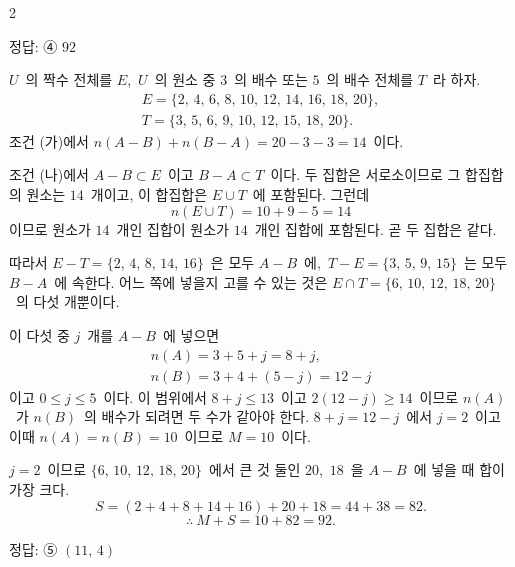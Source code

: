 \documentclass[10pt,fleqn]{article}
\begin{document}
\begin{multicols*}{2}
\begin{dmanswerbox}
정답: ④ $92$
\end{dmanswerbox}

$U$\ 의 짝수 전체를 $E$,\ $U$\ 의 원소 중 $3$\ 의 배수 또는 $5$\ 의 배수 전체를 $T$\ 라 하자.
\begin{gather*}
E=\{2,\,4,\,6,\,8,\,10,\,12,\,14,\,16,\,18,\,20\},\\
T=\{3,\,5,\,6,\,9,\,10,\,12,\,15,\,18,\,20\}.
\end{gather*}
조건 (가)에서 $n(A-B)+n(B-A)=20-3-3=14$\ 이다.

조건 (나)에서 $A-B\subset E$\ 이고 $B-A\subset T$\ 이다. 두 집합은 서로소이므로 그 합집합의 원소는 $14$\ 개이고, 이 합집합은 $E\cup T$\ 에 포함된다. 그런데
$$n(E\cup T)=10+9-5=14$$
이므로 원소가 $14$\ 개인 집합이 원소가 $14$\ 개인 집합에 포함된다. 곧 두 집합은 같다.

따라서 $E-T=\{2,\,4,\,8,\,14,\,16\}$\ 은 모두 $A-B$\ 에,\ $T-E=\{3,\,5,\,9,\,15\}$\ 는 모두 $B-A$\ 에 속한다. 어느 쪽에 넣을지 고를 수 있는 것은 $E\cap T=\{6,\,10,\,12,\,18,\,20\}$\ 의 다섯 개뿐이다.

이 다섯 중 $j$\ 개를 $A-B$\ 에 넣으면
\begin{gather*}
n(A)=3+5+j=8+j,\\
n(B)=3+4+(5-j)=12-j
\end{gather*}
이고 $0\le j\le 5$\ 이다. 이 범위에서 $8+j\le 13$\ 이고 $2(12-j)\ge 14$\ 이므로 $n(A)$\ 가 $n(B)$\ 의 배수가 되려면 두 수가 같아야 한다. $8+j=12-j$\ 에서 $j=2$\ 이고 이때 $n(A)=n(B)=10$\ 이므로 $M=10$\ 이다.

$j=2$\ 이므로 $\{6,\,10,\,12,\,18,\,20\}$\ 에서 큰 것 둘인 $20$,\ $18$\ 을 $A-B$\ 에 넣을 때 합이 가장 크다.
$$S=(2+4+8+14+16)+20+18=44+38=82.$$
$$\therefore\ M+S=10+82=92.$$

\begin{dmanswerbox}
정답: ⑤ $(11,\,4)$
\end{dmanswerbox}


\end{multicols*}
\end{document}
